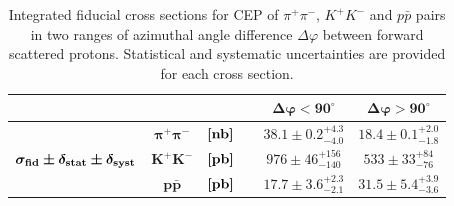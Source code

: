 {
\renewcommand{\arraystretch}{1.5}
\begin{table}[]\centering
\begin{tabular}{ccl c c}
~ & ~ & ~  & $\bm{\Delta\varphi<90^{\circ}}$ & $\bm{\Delta\varphi>90^{\circ}}$ \\ \hline%
\multirow{3}{*}{$\bm{ \sigma_{\text{\bf{fid}}} \pm \delta_{\text{\bf{stat}}} \pm \delta_{\text{\bf{syst}}}}$} & $\bm{\pi^{+}\pi^{-}}$ & $ \bm{[\text{\bf{nb}}]}$~~ & $38.1\pm0.2^{+4.3}_{-4.0}$ & $18.4\pm0.1^{+2.0}_{-1.8}$ \\ %
~ & $\bm{K^{+}K^{-}}$ & $\bm{[\text{\bf{pb}}]}$~~ & $976\pm46^{+156}_{-140}$ & $533\pm33^{+84}_{-76}$ \\ %
~ & $\bm{p\bar{p}}$ & $\bm{[\text{\bf{pb}}]}$~~ & $17.7\pm3.6^{+2.3}_{-2.1}$ & $31.5\pm5.4^{+3.9}_{-3.6}$\\ \hline%
\end{tabular}
\caption{Integrated fiducial cross sections for CEP of $\pi^{+}\pi^{-}$, $K^{+}K^{-}$ and $p\bar{p}$ pairs in two ranges of azimuthal angle difference $\Delta\varphi$ between forward scattered protons. Statistical and systematic uncertainties are provided for each cross section.}\label{tab:xSec}
\end{table}
}


